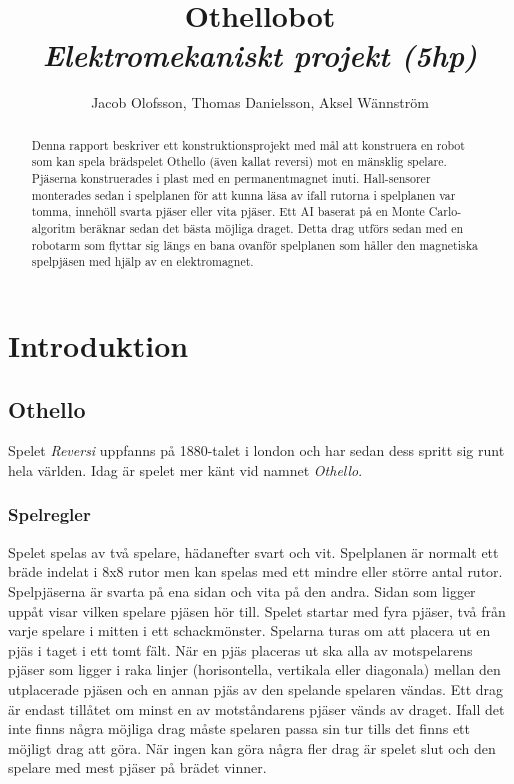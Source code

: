 \documentclass[a4paper]{article}
\begin{document}
\title{
	\textbf{Othellobot}\\
	\textit{Elektromekaniskt projekt (5hp)}
}
\author{Jacob Olofsson, Thomas Danielsson, Aksel Wännström}
\maketitle

\pagebreak

\begin{abstract}
Denna rapport beskriver ett konstruktionsprojekt med mål att konstruera en robot som kan spela brädspelet Othello (även kallat reversi) mot en mänsklig spelare.
Pjäserna konstruerades i plast med en permanentmagnet inuti.
Hall-sensorer monterades sedan i spelplanen för att kunna läsa av ifall rutorna i spelplanen var tomma, innehöll svarta pjäser eller vita pjäser.
Ett AI baserat på en Monte Carlo-algoritm beräknar sedan det bästa möjliga draget.
Detta drag utförs sedan med en robotarm som flyttar sig längs en bana ovanför spelplanen som håller den magnetiska spelpjäsen med hjälp av en elektromagnet.
\end{abstract}

\tableofcontents

\pagebreak
{}

\section{Introduktion}
\subsection{Othello}
Spelet \textit{Reversi} uppfanns på 1880-talet i london och har sedan dess spritt sig runt hela världen.
Idag är spelet mer känt vid namnet \textit{Othello}.

\subsubsection*{Spelregler}
Spelet spelas av två spelare, hädanefter svart och vit.
Spelplanen är normalt ett bräde indelat i 8x8 rutor men kan spelas med ett mindre eller större antal rutor.
Spelpjäserna är svarta på ena sidan och vita på den andra.
Sidan som ligger uppåt visar vilken spelare pjäsen hör till.
Spelet startar med fyra pjäser, två från varje spelare i mitten i ett schackmönster.
Spelarna turas om att placera ut en pjäs i taget i ett tomt fält.
När en pjäs placeras ut ska alla av motspelarens pjäser som ligger i raka linjer (horisontella, vertikala eller diagonala) mellan den utplacerade pjäsen och en annan pjäs av den spelande spelaren vändas.
Ett drag är endast tillåtet om minst en av motståndarens pjäser vänds av draget.
Ifall det inte finns några möjliga drag måste spelaren passa sin tur tills det finns ett möjligt drag att göra.
När ingen kan göra några fler drag är spelet slut och den spelare med mest pjäser på brädet vinner.
\end{document}

